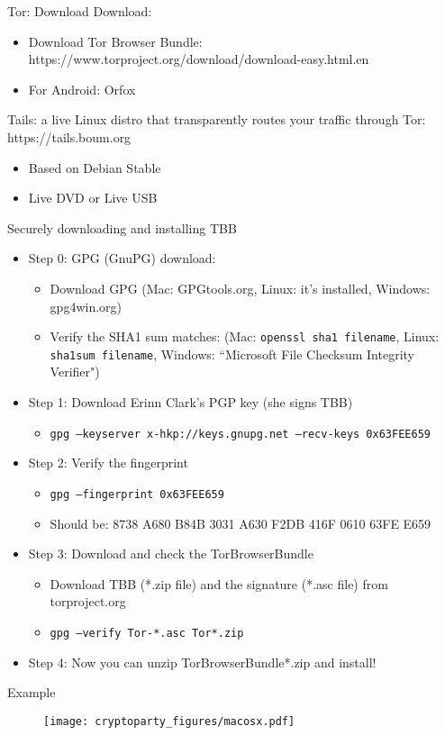 \documentclass{beamer}
\begin{document}
\begin{frame}{Tor: Download}
Download:
\begin{itemize}
   \item Download Tor Browser Bundle: https://www.torproject.org/download/download-easy.html.en
   \item For Android: Orfox
\end{itemize}

Tails: a live Linux distro that transparently routes your traffic through Tor: https://tails.boum.org
\begin{itemize} 
   \item{Based on Debian Stable}
   \item{Live DVD or Live USB}
\end{itemize}

\end{frame}

\begin{frame}{Securely downloading and installing TBB}
\begin{itemize} 
\item Step 0: GPG (GnuPG) download:
\begin{itemize}
\item Download GPG (Mac: GPGtools.org, Linux: it's installed, Windows: gpg4win.org)
\item Verify the SHA1 sum matches: (Mac: \texttt{openssl sha1 filename}, Linux: \texttt{sha1sum filename}, Windows: ``Microsoft File Checksum Integrity Verifier")
\end{itemize}
\item Step 1: Download Erinn Clark's PGP key (she signs TBB)
\begin{itemize}
\item \texttt{gpg --keyserver x-hkp://keys.gnupg.net --recv-keys 0x63FEE659}
\end{itemize}

\item Step 2: Verify the fingerprint
\begin{itemize}
\item \texttt{gpg --fingerprint 0x63FEE659}
\item Should be: 8738 A680 B84B 3031 A630 F2DB 416F 0610 63FE E659
\end{itemize}

\item Step 3: Download and check the TorBrowserBundle
\begin{itemize}
\item Download TBB (*.zip file) and the signature (*.asc file) from torproject.org
\item \texttt{gpg --verify Tor-*.asc Tor*.zip}
\end{itemize}

\item Step 4: Now you can unzip TorBrowserBundle*.zip and install!
\end{itemize}

\end{frame}

\begin{frame}{Example}
\begin{figure}
\centering
\texttt{[image: cryptoparty\_figures/macosx.pdf]}
\end{figure}
\end{frame}

\end{document}

